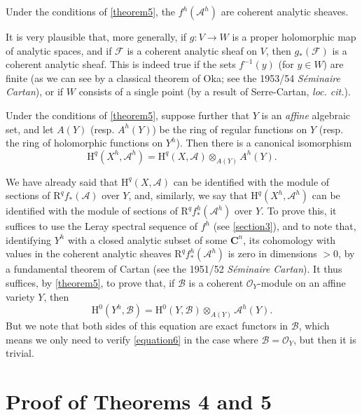 \documentclass{article}
\theoremstyle{plain}
\newenvironment{corollary}[1]
    {\renewcommand\theinnercustomcorollary{#1}\innercustomcorollary}
    {\endinnercustomcorollary}
\theoremstyle{definition}
\newcommand{\sh}{\mathscr}
\newcommand{\HH}{\mathrm{H}}
\newcommand{\RR}{\mathrm{R}}
\newcommand{\oldpage}[1]{\marginpar{\footnotesize$\Big\vert$ \textit{p.~#1}}}
\begin{document}
\begin{corollary}{2}
\label{corollary2-5}
  Under the conditions of \cref{theorem5}, the $f^h(\sh{A}^h)$ are coherent analytic sheaves.
\end{corollary}

\oldpage{2-10}
It is very plausible that, more generally, if $g\colon V\to W$ is a proper holomorphic map of analytic spaces, and if $\sh{F}$ is a coherent analytic sheaf on $V$, then $g_*(\sh{F})$ is a coherent analytic sheaf.
This is indeed true if the sets $f^{-1}(y)$ (for $y\in W$) are finite (as we can see by a classical theorem of Oka; see the 1953/54 \emph{S\'{e}minaire Cartan}), or if $W$ consists of a single point (by a result of Serre-Cartan, \emph{loc. cit.}).

\begin{corollary}{3}
\label{corollary3-5}
  Under the conditions of \cref{theorem5}, suppose further that $Y$ is an \emph{affine} algebraic set, and let $A(Y)$ (resp. $A^h(Y)$) be the ring of regular functions on $Y$ (resp. the ring of holomorphic functions on $Y^h$).
  Then there is a canonical isomorphism
  \[
  \label{equation5}
    \HH^q(X^h,\sh{A}^h) = \HH^q(X,\sh{A})\otimes_{A(Y)}A^h(Y).
    \tag{5}
  \]
\end{corollary}

We have already said that $\HH^q(X,\sh{A})$ can be identified with the module of sections of $\RR^qf_*(\sh{A})$ over $Y$, and, similarly, we say that $\HH^q(X^h,\sh{A}^h)$ can be identified with the module of sections of $\RR^qf_*^h(\sh{A}^h)$ over $Y$.
To prove this, it suffices to use the Leray spectral sequence of $f^h$ (see \cref{section3}), and to note that, identifying $Y^h$ with a closed analytic subset of some $\mathbf{C}^n$, its cohomology with values in the coherent analytic sheaves $\RR^qf_*^h(\sh{A}^h)$ is zero in dimensions $>0$, by a fundamental theorem of Cartan (see the 1951/52 \emph{S\'{e}minaire Cartan}).
It thus suffices, by \cref{theorem5}, to prove that, if $\sh{B}$ is a coherent $\sh{O}_Y$-module on an affine variety $Y$, then
\[
\label{equation6}
  \HH^0(Y^h,\sh{B}) = \HH^0(Y,\sh{B})\otimes_{A(Y)}\sh{A}^h(Y).
  \tag{6}
\]
But we note that both sides of this equation are exact functors in $\sh{B}$, which means we only need to verify \cref{equation6} in the case where $\sh{B}=\sh{O}_Y$, but then it is trivial.


\section{Proof of Theorems 4 and 5}
\label{section7}
\end{document}
